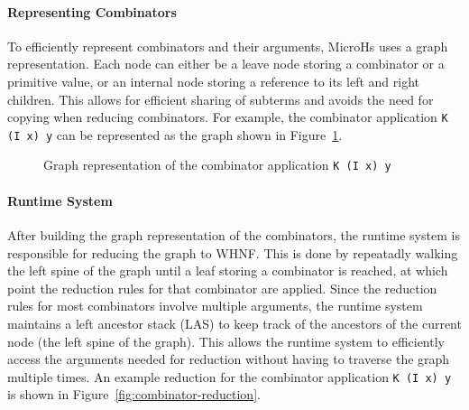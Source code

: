 \paragraph{Representing Combinators}
To efficiently represent combinators and their arguments, MicroHs uses a graph representation. Each node can either be a leave node storing a combinator or a primitive value, or an internal node storing a reference to its left and right children. This allows for efficient sharing of subterms and avoids the need for copying when reducing combinators. For example, the combinator application \texttt{K (I x) y} can be represented as the graph shown in Figure~\ref{fig:combinator-graph}.
\begin{figure}[t]
\centering
{}
\caption{Graph representation of the combinator application \texttt{K (I x) y}}
\label{fig:combinator-graph}
\end{figure}

\paragraph{Runtime System}
After building the graph representation of the combinators, the runtime system is responsible for reducing the graph to WHNF. This is done by repeatadly walking the left spine of the graph until a leaf storing a combinator is reached, at which point the reduction rules for that combinator are applied. Since the reduction rules for most combinators involve multiple arguments, the runtime system maintains a left ancestor stack (LAS) to keep track of the ancestors of the current node (the left spine of the graph). This allows the runtime system to efficiently access the arguments needed for reduction without having to traverse the graph multiple times. An example reduction for the combinator application \texttt{K (I x) y} is shown in Figure~\ref{fig:combinator-reduction}. 

